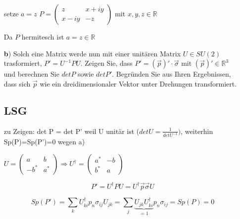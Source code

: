 \begin{enumerate}
setze \(a=z\)  \(P=\begin{pmatrix} z&x+iy\\x-iy&-z\end{pmatrix}\) mit \(x,y,z \in \mathbb R\)

Da \(P\) hermitesch ist \(a=z\in \mathbb R\)



\item[\textbf{b})] Solch eine Matrix werde nun mit einer unitären Matrix \(U\in SU(2)\) trasformiert, \(P' = U^{-1}PU\). Zeigen Sie, dass \(P'=(\vec p)'\cdot \vec \sigma\) mit \((\vec p)' \in \mathbb R^3\) und berechnen Sie \(det P\) sowie \(det P'\). Begründen Sie aus Ihren Ergebnissen, dass sich \(\vec p\) wie ein dreidimensionaler Vektor unter Drehungen transformiert.

\subsection*{LSG}

zu Zeigen: det P = det P' weil U unitär ist (\(detU=\frac{1}{detU^{-1}})\), weiterhin
Sp(P)=Sp(P')=0 wegen a)

\(U =\begin{pmatrix}a&b\\-b^*&a^* \end{pmatrix} \Rightarrow U^\dagger = \begin{pmatrix}a^*&-b\\b^*&a \end{pmatrix}  \)

\[ P' = U^\dagger P U = U^\dagger \vec p \vec \sigma U\]

\[Sp(P') = \sum_k U^\dagger_{ki} p_n\sigma_{ij} U_{jk} = \sum_j \underbrace{U_{jk}U^\dagger_{ki}}_{=1} p_n\sigma_{ij} = Sp(P)=0\]


\end{enumerate}
